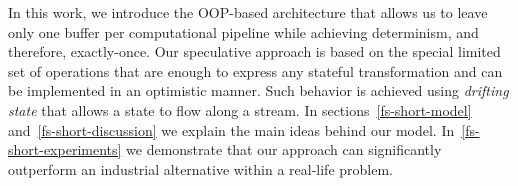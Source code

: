 In this work, we introduce the OOP-based architecture that allows us to leave only one buffer per computational pipeline while achieving determinism, and therefore, exactly-once. Our speculative approach is based on the special limited set of operations that are enough to express any stateful transformation and can be implemented in an optimistic manner. Such behavior is achieved using {\em drifting state} that allows a state to flow along a stream. In sections~\ref{fs-short-model} and~\ref{fs-short-discussion} we explain the main ideas behind our model. In~\ref{fs-short-experiments} we demonstrate that our approach can significantly outperform an industrial alternative within a real-life problem. 